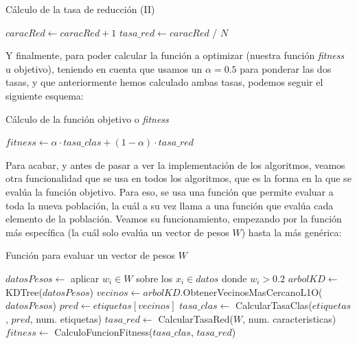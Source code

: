 \documentclass[11pt,a4paper]{article}
\begin{document}
\begin{algorithm}[H]
\caption{Cálculo de la tasa de reducción (II)}
\begin{algorithmic}
		\State $caracRed \gets caracRed + 1$
	\EndIf
\EndFor
\State $tasa\_red \gets caracRed$ / $N$
\State {}
\EndFunction
\end{algorithmic}
\end{algorithm}

Y finalmente, para poder calcular la función a optimizar (nuestra función \textit{fitness} u objetivo), teniendo en cuenta que
usamos un $\alpha = 0.5$ para ponderar las dos tasas, y que anteriormente hemos calculado ambas tasas, podemos seguir el
siguiente esquema:

\begin{algorithm}[H]
\caption{Cálculo de la función objetivo o \textit{fitness}}
\begin{algorithmic}[1]
\State $fitness \gets \alpha \cdot tasa\_clas + (1 - \alpha) \cdot tasa\_red$
\State {}
\EndFunction
\end{algorithmic}
\end{algorithm}

Para acabar, y antes de pasar a ver la implementación de los algoritmos, veamos otra funcionalidad que se usa en todos los
algoritmos, que es la forma en la que se evalúa la función objetivo. Para eso, se usa una función que permite evaluar a toda la
nueva población, la cuál a su vez llama a una función que evalúa cada elemento de la población. Veamos su funcionamiento,
empezando por la función más específica (la cuál solo evalúa un vector de pesos $W$) hasta la más genérica:

\begin{algorithm}[H]
\caption{Función para evaluar un vector de pesos $W$}
\begin{algorithmic}[1]
\State $datosPesos \gets$ aplicar $w_i \in W$ sobre los $x_i \in datos$ donde $w_i > 0.2$
\State $arbolKD \gets$ KDTree($datosPesos$)
\State $vecinos \gets arbolKD$.ObtenerVecinosMasCercanoL1O($datosPesos$)
\State $pred \gets etiquetas[vecinos]$
\State $tasa\_clas \gets$ CalcularTasaClas($etiquetas$, $pred$, num. etiquetas)
\State $tasa\_red \gets$ CalcularTasaRed($W$, num. caracteristicas)
\State $fitness \gets$ CalculoFuncionFitness($tasa\_clas$, $tasa\_red$)
\State {}
\EndFunction
\end{algorithmic}
\end{algorithm}
\end{document}
